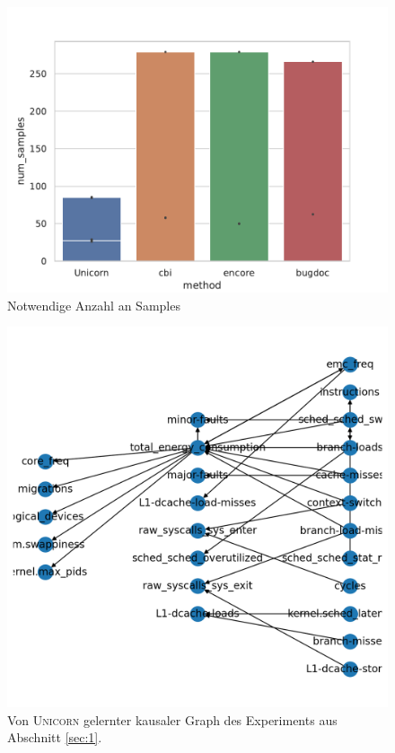 \documentclass[11pt]{article}
\begin{document}
\begin{figure}[tp!]
  \centering
  \includegraphics[width=\linewidth]{./img/win_debug_num_samples.pdf}
  \caption{Notwendige Anzahl an Samples}

  \label{fig:3}
\end{figure}

\begin{figure}[tp!]
  \centering
  \includegraphics[width=\linewidth]{./img/causal_graph.png}
  \caption{Von \textsc{Unicorn} gelernter kausaler Graph des Experiments aus Abschnitt \ref{sec:1}.}

  \label{fig:2}
\end{figure}
\end{document}
